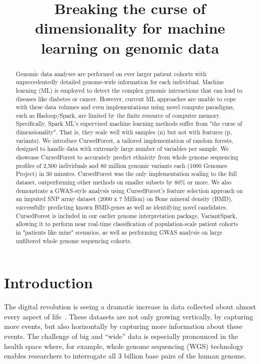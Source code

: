 \documentclass[a4paper]{amsart}
\title{Breaking the curse of dimensionality for machine learning on genomic data}
\begin{document}
  
\maketitle

\begin{abstract}
Genomic data analyses are performed on ever larger patient cohorts with unprecedentedly detailed genome-wide information for each individual. Machine learning (ML) is employed to detect the complex genomic interactions that can lead to diseases like diabetes or cancer. 
However, current ML approaches are unable to cope with these data volumes and even implementations using novel compute paradigms, such as Hadoop/Spark, are limited by the finite resource of computer memory. Specifically, Spark ML's supervised machine learning methods suffer from "the curse of dimensionality". That is, they scale well with samples (n) but not with features (p, variants). 
We introduce CursedForest, a tailored implementation of random forests, designed to handle data with extremely large number of variables per sample. We showcase CursedForest to accurately predict ethnicity from whole genome sequencing profiles of 2,500 individuals and 80 million genomic variants each (1000 Genomes Project) in 30 minutes. CursedForest was the only implementation scaling to the full dataset, outperforming other methods on smaller subsets by 80\% or more. We also demonstrate a GWAS-style analysis using CursedForest's feature selection approach on an imputed SNP array dataset (2000 x 7 Million) on Bone mineral density (BMD), successfully predicting known BMD-genes as well as identifying novel candidates. 
CursedForest is included in our earlier genome interpretation package, VariantSpark, allowing it to perform near real-time classification of population-scale patient cohorts in "patients like mine" scenarios, as well as performing GWAS analysis on large unfiltered whole genome sequencing cohorts. 
\end{abstract}



\section{Introduction}
The digital revolution is seeing a dramatic increase in data collected about almost every aspect of
life~\cite{Loebbecke2015}.  These datasets are not only growing vertically, by capturing more events, but also
horizontally by capturing more information about these events.  The challenge of big and ``wide'' data is especially
pronounced in the health space where, for example, whole genome sequencing (WGS) technology enables researchers to
interrogate all 3 billion base pairs of the human genome.
\end{document}
